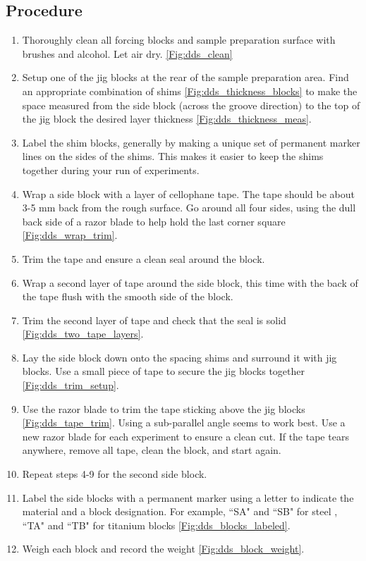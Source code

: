 \subsection{Procedure}
\begin{enumerate}
\item Thoroughly clean all forcing blocks and sample preparation surface with brushes and alcohol. Let air dry. \ref{Fig:dds_clean}
\item Setup one of the jig blocks at the rear of the sample preparation area. Find an appropriate combination of shims \ref{Fig:dds_thickness_blocks} to make the space measured from the side block (across the groove direction) to the top of the jig block the desired layer thickness \ref{Fig:dds_thickness_meas}.
\item Label the shim blocks, generally by making a unique set of permanent marker lines on the sides of the shims. This makes it easier to keep the shims together during your run of experiments.
\item Wrap a side block with a layer of cellophane tape. The tape should be about 3-5 mm back from the rough surface. Go around all four sides, using the dull back side of a razor blade to help hold the last corner square \ref{Fig:dds_wrap_trim}.
\item Trim the tape and ensure a clean seal around the block.
\item Wrap a second layer of tape around the side block, this time with the back of the tape flush with the smooth side of the block.
\item Trim the second layer of tape and check that the seal is solid \ref{Fig:dds_two_tape_layers}.
\item Lay the side block down onto the spacing shims and surround it with jig blocks. Use a small piece of tape to secure the jig blocks together \ref{Fig:dds_trim_setup}.
\item Use the razor blade to trim the tape sticking above the jig blocks \ref{Fig:dds_tape_trim}. Using a sub-parallel angle seems to work best. Use a new razor blade for each experiment to ensure a clean cut. If the tape tears anywhere, remove all tape, clean the block, and start again.
\item Repeat steps 4-9 for the second side block.
\item Label the side blocks with a permanent marker using a letter to indicate the material and a block designation. For example, ``SA" and ``SB" for steel , ``TA" and ``TB" for titanium blocks \ref{Fig:dds_blocks_labeled}.
\item Weigh each block and record the weight \ref{Fig:dds_block_weight}.

\end{enumerate}
